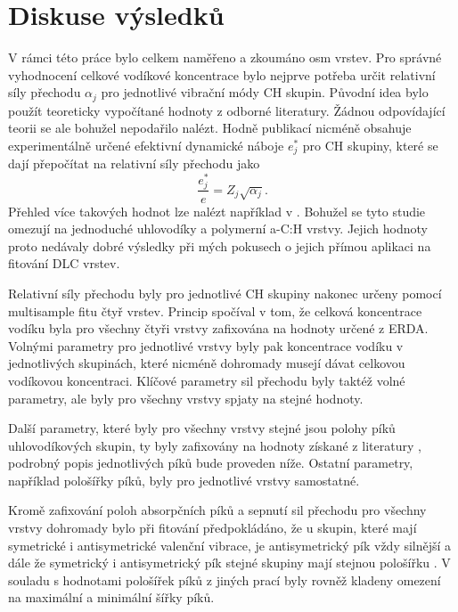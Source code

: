 \chapter{Diskuse výsledků}
\def\floatpagefraction{0.85}

V rámci této práce bylo celkem naměřeno a zkoumáno osm vrstev. Pro správné vyhodnocení celkové vodíkové koncentrace bylo nejprve potřeba určit relativní síly přechodu $\alpha_j$ pro jednotlivé vibrační módy CH skupin. Původní idea bylo použít teoreticky vypočítané hodnoty z odborné literatury. Žádnou odpovídající teorii se ale bohužel nepodařilo nalézt. Hodně publikací nicméně obsahuje experimentálně určené efektivní dynamické náboje $e_j^*$ pro CH skupiny, které se dají přepočítat na relativní síly přechodu jako \cite{sumrule2}
%
\begin{equation}
\frac{e_j^*}{e} = Z_j \sqrt{\alpha_j} \text{.}
\label{efch2str}
\end{equation}
%
Přehled více takových hodnot lze nalézt například v \cite{Heitz1998}. Bohužel se tyto studie omezují na jednoduché uhlovodíky a polymerní a-C:H vrstvy. Jejich hodnoty proto nedávaly dobré výsledky při mých pokusech o jejich přímou aplikaci na fitování DLC vrstev. 

Relativní síly přechodu byly pro jednotlivé CH skupiny nakonec určeny pomocí multi\-sample fitu čtyř vrstev. Princip spočíval v tom, že celková koncentrace vodíku byla pro všechny čtyři vrstvy zafixována na hodnoty určené z ERDA. Volnými parametry pro jednotlivé vrstvy byly pak koncentrace vodíku v jednotlivých skupinách, které nicméně dohromady musejí dávat celkovou vodíkovou koncentraci. Klíčové parametry sil přechodu byly taktéž volné parametry, ale byly pro všechny vrstvy spjaty na stejné hodnoty. 

Další parametry, které byly pro všechny vrstvy stejné jsou polohy píků uhlovodíkových skupin, ty byly zafixovány na hodnoty získané z literatury \cite{Robertson2002, Dischler1983, Ristein1998, Zajickova2011}, podrobný popis jednotlivých píků bude proveden níže. Ostatní parametry, například pološířky píků, byly pro jednotlivé vrstvy samostatné.

Kromě zafixování poloh absorpčních píků a sepnutí sil přechodu pro všechny vrstvy dohromady bylo při fitování předpokládáno, že
u skupin, které mají symetrické i antisymetrické valenční vibrace, je antisymetrický pík vždy silnější a dále  že symetrický i antisymetrický pík stejné skupiny mají stejnou pološířku \cite{Heitz1998}. V souladu s hodnotami pološířek píků z jiných prací \cite{Dischler1983, Zajickova2011} byly rovněž kladeny omezení na maximální a minimální šířky píků.

